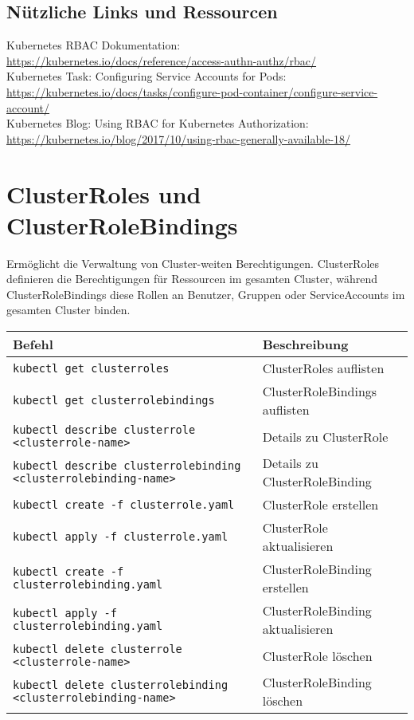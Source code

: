 \subsection*{Nützliche Links und Ressourcen}
Kubernetes RBAC Dokumentation:\\
\url{https://kubernetes.io/docs/reference/access-authn-authz/rbac/}\\
Kubernetes Task: Configuring Service Accounts for Pods:\\
\url{https://kubernetes.io/docs/tasks/configure-pod-container/configure-service-account/}\\
Kubernetes Blog: Using RBAC for Kubernetes Authorization:\\
\url{https://kubernetes.io/blog/2017/10/using-rbac-generally-available-18/}\\

\newpage

\section{ClusterRoles und ClusterRoleBindings}
Ermöglicht die Verwaltung von Cluster-weiten Berechtigungen. ClusterRoles definieren die Berechtigungen für Ressourcen im gesamten Cluster, während ClusterRoleBindings diese Rollen an Benutzer, Gruppen oder ServiceAccounts im gesamten Cluster binden.\\

\noindent
\begin{tabular}{|p{}|p{}|}
\hline
\textbf{Befehl} & \textbf{Beschreibung} \\
\hline
\texttt{kubectl get clusterroles} & ClusterRoles auflisten \\
\texttt{kubectl get clusterrolebindings} & ClusterRoleBindings auflisten \\
\texttt{kubectl describe clusterrole <clusterrole-name>} & Details zu ClusterRole \\
\texttt{kubectl describe clusterrolebinding <clusterrolebinding-name>} & Details zu ClusterRoleBinding\\
\texttt{kubectl create -f clusterrole.yaml} & ClusterRole erstellen\\
\texttt{kubectl apply -f clusterrole.yaml} & ClusterRole aktualisieren\\
\texttt{kubectl create -f clusterrolebinding.yaml} & ClusterRoleBinding erstellen\\
\texttt{kubectl apply -f clusterrolebinding.yaml} & ClusterRoleBinding aktualisieren\\
\texttt{kubectl delete clusterrole <clusterrole-name>} & ClusterRole löschen \\
\texttt{kubectl delete clusterrolebinding <clusterrolebinding-name>} & ClusterRoleBinding löschen \\
\hline
\end{tabular}

